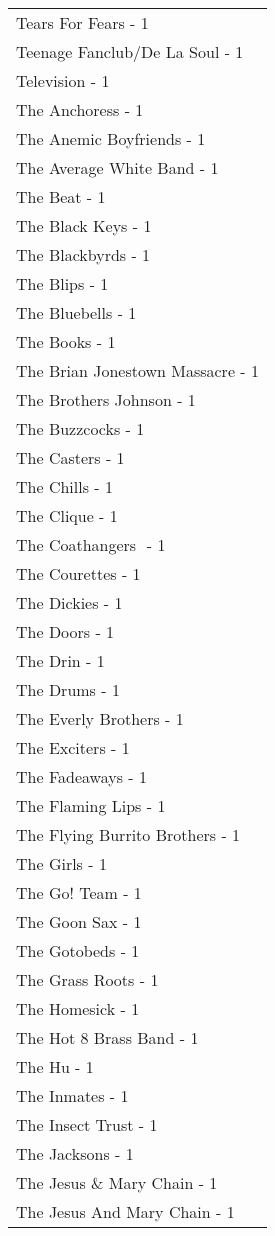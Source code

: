 \documentclass[
]{article}
\begin{document}
\begin{longtable}{l}
Tears For Fears - 1 \\ 
Teenage Fanclub/De La Soul - 1 \\ 
Television - 1 \\ 
The Anchoress - 1 \\ 
The Anemic Boyfriends - 1 \\ 
The Average White Band - 1 \\ 
The Beat - 1 \\ 
The Black Keys - 1 \\ 
The Blackbyrds - 1 \\ 
The Blips - 1 \\ 
The Bluebells - 1 \\ 
The Books - 1 \\ 
The Brian Jonestown Massacre - 1 \\ 
The Brothers Johnson - 1 \\ 
The Buzzcocks - 1 \\ 
The Casters - 1 \\ 
The Chills - 1 \\ 
The Clique - 1 \\ 
The Coathangers ‎ - 1 \\ 
The Courettes - 1 \\ 
The Dickies - 1 \\ 
The Doors - 1 \\ 
The Drin - 1 \\ 
The Drums - 1 \\ 
The Everly Brothers - 1 \\ 
The Exciters - 1 \\ 
The Fadeaways - 1 \\ 
The Flaming Lips - 1 \\ 
The Flying Burrito Brothers - 1 \\ 
The Girls - 1 \\ 
The Go! Team - 1 \\ 
The Goon Sax - 1 \\ 
The Gotobeds - 1 \\ 
The Grass Roots - 1 \\ 
The Homesick - 1 \\ 
The Hot 8 Brass Band - 1 \\ 
The Hu - 1 \\ 
The Inmates - 1 \\ 
The Insect Trust - 1 \\ 
The Jacksons - 1 \\ 
The Jesus \& Mary Chain - 1 \\ 
The Jesus And Mary Chain - 1 \\ 

\end{longtable}
\end{document}
